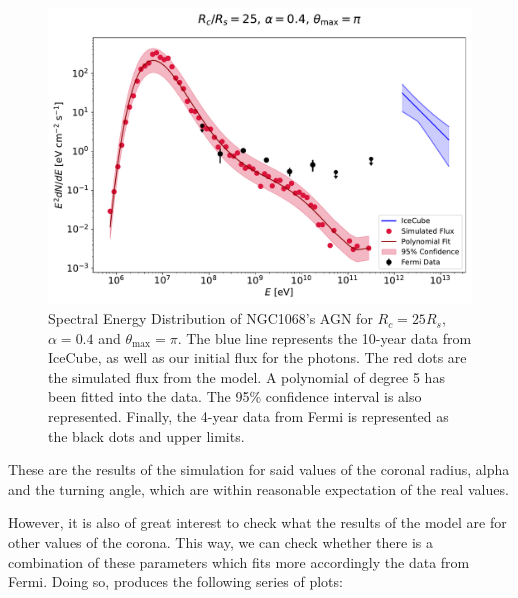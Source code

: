 \begin{figure}[H]
    \includegraphics[width=\textwidth]{Figures/example_simulation_plot.pdf}
    \centering
    \caption{Spectral Energy Distribution of NGC1068's AGN for $R_c=25R_s$, $\alpha=0.4$ and $\theta_{\max} = \pi$. The blue line represents the 10-year data from IceCube, as well as our initial flux for the photons. The red dots are the simulated flux from the model. A polynomial of degree 5 has been fitted into the data. The 95\% confidence interval is also represented. Finally, the 4-year data from Fermi is represented as the black dots and upper limits.}
    \label{fig:example_simulation_plot}
\end{figure}

These are the results of the simulation for said values of the coronal radius, alpha and the turning angle, which are within reasonable expectation of the real values.

However, it is also of great interest to check what the results of the model are for other values of the corona. This way, we can check whether there is a combination of these parameters which fits more accordingly the data from Fermi. Doing so, produces the following series of plots:

